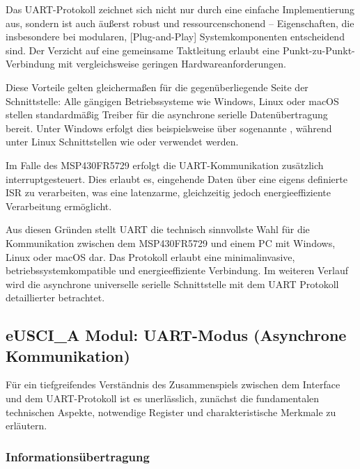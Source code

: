 Das UART-Protokoll zeichnet sich nicht nur durch eine einfache Implementierung aus, sondern ist auch \"au{\ss}erst robust und ressourcenschonend -- Eigenschaften, die insbesondere bei modularen, [Plug-and-Play] Systemkomponenten entscheidend sind. Der Verzicht auf eine gemeinsame Taktleitung erlaubt eine Punkt-zu-Punkt-Verbindung mit vergleichsweise geringen Hardwareanforderungen. 

Diese Vorteile gelten gleicherma{\ss}en f\"ur die gegen\"uberliegende Seite der Schnittstelle: Alle g\"angigen Betriebssysteme wie Windows, Linux oder macOS stellen standardm\"aßig Treiber f\"ur die asynchrone serielle Daten\"ubertragung bereit. Unter Windows erfolgt dies beispielsweise \"uber sogenannte , w\"ahrend unter Linux Schnittstellen wie  oder  verwendet werden.

Im Falle des MSP430FR5729 erfolgt die UART-Kommunikation zus\"atzlich interruptgesteuert. Dies erlaubt es, eingehende Daten \"uber eine eigens definierte ISR zu verarbeiten, was eine latenzarme, gleichzeitig jedoch energieeffiziente Verarbeitung erm\"oglicht.

Aus diesen Gr\"unden stellt UART die technisch sinnvollste Wahl f\"ur die Kommunikation zwischen dem MSP430FR5729 und einem PC mit Windows, Linux oder macOS dar. Das Protokoll erlaubt eine minimalinvasive, betriebssystemkompatible und energieeffiziente Verbindung. Im weiteren Verlauf wird die asynchrone universelle serielle Schnittstelle mit dem UART Protokoll detaillierter betrachtet.\AI

\subsection{eUSCI\_A Modul: UART-Modus (Asynchrone Kommunikation)}
\label{sec:eUSCI_UART}

F\"ur ein tiefgreifendes Verst\"andnis des Zusammenspiels zwischen dem Interface und dem UART-Protokoll ist es unerl\"asslich, zun\"achst die fundamentalen technischen Aspekte, notwendige Register und charakteristische Merkmale zu erl\"autern.

\subsubsection{Informations\"ubertragung}
\label{sec:UART_uebertragung}

